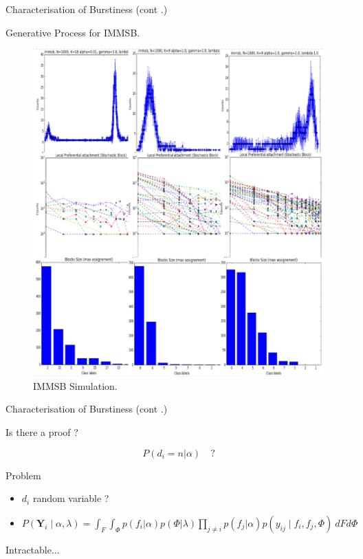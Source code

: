 \begin{frame}[c]{Characterisation of Burstiness (cont .)}

    Generative Process for IMMSB.

        \begin{figure}[h]
            \caption{IMMSB Simulation.}
        \includegraphics[scale=0.2]{img/mmsb_burst.pdf}
        \end{figure}
\end{frame}

%
%

\begin{frame}[c]{Characterisation of Burstiness (cont .)}

    Is there a proof ?

    \[ P(d_i=n | \alpha) \quad ?\]
    \begin{block}{Problem}
        \begin{itemize}
            \item $d_i$ random variable ?
            \item $P(\bm{Y}_i \mid \alpha, \lambda) = \int_F \int_\Phi p(f_i| \alpha)p(\Phi|\lambda) \prod_{j\neq i} p(f_j|\alpha) p(y_{ij} \mid f_i, f_j, \Phi) \ dF d\Phi$
        \end{itemize}
    \end{block}

    \alert{Intractable}...
\end{frame}



